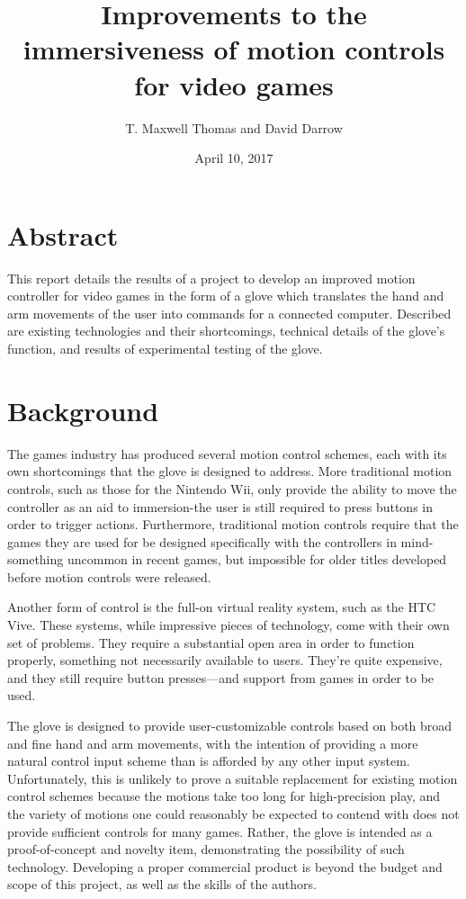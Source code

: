 \documentclass{article}
\begin{document}
	\begin{titlepage}
		\title{Improvements to the immersiveness  of motion controls for video games}
		\date{April 10, 2017}
		\author{T. Maxwell Thomas and David Darrow}
		\maketitle
	\end{titlepage}
	\section{Abstract}
	
	This report details the results of a project to develop an improved motion controller for video games in the form of a glove which translates the hand and arm movements of the user into commands for a connected computer. Described are existing technologies and their shortcomings, technical details of the glove's function, and results of experimental testing of the glove.
	\section{Background}
	
	The games industry has produced several motion control schemes, each with its own shortcomings that the glove is designed to address. More traditional motion controls, such as those for the Nintendo Wii, only provide the ability to move the controller as an aid to immersion-the user is still required to press buttons in order to trigger actions. Furthermore, traditional motion controls require that the games they are used for be designed specifically with the controllers in mind-something uncommon in recent games, but impossible for older titles developed before motion controls were released.
	
	Another form of control is the full-on virtual reality system, such as the HTC Vive. These systems, while impressive pieces of technology, come with their own set of problems. They require a substantial open area in order to function properly, something not necessarily available to users. They're quite expensive, and they still require button presses---and support from games in order to be used.
	
	The glove is designed to provide user-customizable controls based on both broad and fine hand and arm movements, with the intention of providing a more natural control input scheme than is afforded by any other input system. Unfortunately, this is unlikely to prove a suitable replacement for existing motion control schemes because the motions take too long for high-precision play, and the variety of motions one could reasonably be expected to contend with does not provide sufficient controls for many games. Rather, the glove is intended as a proof-of-concept and novelty item, demonstrating the possibility of such technology. Developing a proper commercial product is beyond the budget and scope of this project, as well as the skills of the authors.
	
\end{document}
